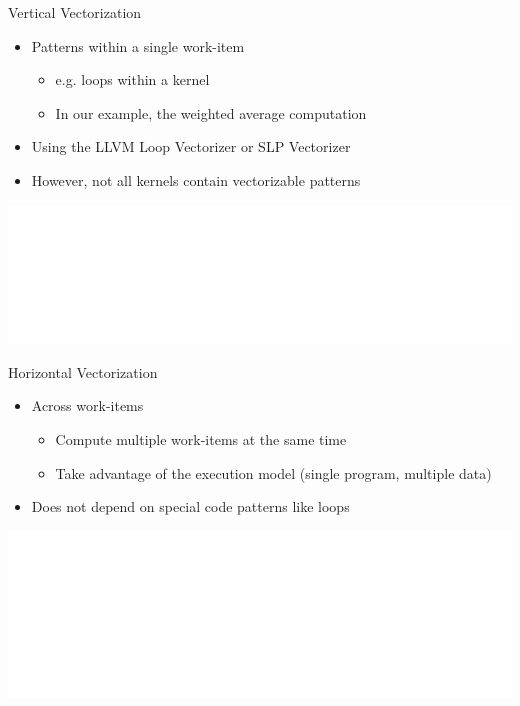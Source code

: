 
\begin{frame}{Vertical Vectorization}

\begin{itemize}
    \item Patterns within a single work-item
    \begin{itemize}
        \item e.g. loops within a kernel
        \item In our example, the weighted average computation
        \end{itemize}
    \item Using the LLVM Loop Vectorizer or SLP Vectorizer
    \item However, not all kernels contain vectorizable patterns
\end{itemize}

\vspace{2ex}
\hspace{1em}\includegraphics[scale=0.75]{images/vertical-vectorization.pdf}

\end{frame}


\begin{frame}{Horizontal Vectorization}

\begin{itemize}
    \item Across work-items
    \begin{itemize}
        \item Compute multiple work-items at the same time
        \item Take advantage of the execution model (single program, multiple data)
    \end{itemize}
    \item Does not depend on special code patterns like loops
\end{itemize}

\vspace{2ex}
\hspace{1em}\includegraphics[scale=0.8]{images/horizontal-vectorization.pdf}

\end{frame}

